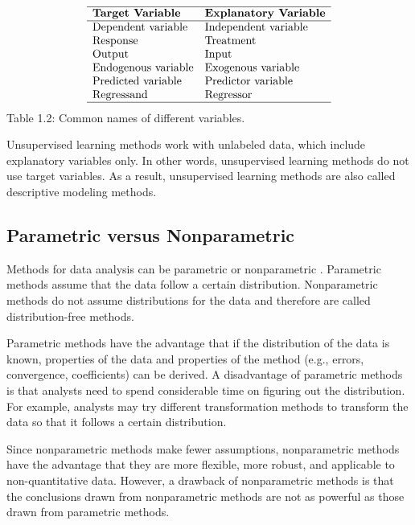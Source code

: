 \documentclass[]{book}
\theoremstyle{definition}
\theoremstyle{definition}
\theoremstyle{definition}
\theoremstyle{remark}
\begin{document}
\[\begin{matrix}
\begin{array}{ll}
\hline
\textbf{Target Variable}  &  \textbf{Explanatory Variable}\\\hline
\text{Dependent variable} & \text{Independent variable}\\
\text{Response} & \text{Treatment} \\
\text{Output} & \text{Input} \\
\text{Endogenous variable} & \text{Exogenous variable} \\
\text{Predicted variable} & \text{Predictor variable} \\
\text{Regressand} & \text{Regressor} \\
\hline
\end{array}
\end{matrix}
\] Table 1.2: Common names of different variables.

Unsupervised learning methods work with unlabeled data, which include
explanatory variables only. In other words, unsupervised learning
methods do not use target variables. As a result, unsupervised learning
methods are also called descriptive modeling methods.

\subsection{Parametric versus
Nonparametric}\label{parametric-versus-nonparametric}

Methods for data analysis can be parametric or nonparametric
\citep{abbott2014}. Parametric methods assume that the data follow a
certain distribution. Nonparametric methods do not assume distributions
for the data and therefore are called distribution-free methods.

Parametric methods have the advantage that if the distribution of the
data is known, properties of the data and properties of the method
(e.g., errors, convergence, coefficients) can be derived. A disadvantage
of parametric methods is that analysts need to spend considerable time
on figuring out the distribution. For example, analysts may try
different transformation methods to transform the data so that it
follows a certain distribution.

Since nonparametric methods make fewer assumptions, nonparametric
methods have the advantage that they are more flexible, more robust, and
applicable to non-quantitative data. However, a drawback of
nonparametric methods is that the conclusions drawn from nonparametric
methods are not as powerful as those drawn from parametric methods.
\end{document}
